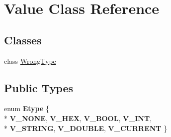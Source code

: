 \hypertarget{classValue}{\section{Value Class Reference}
\label{classValue}
}
\subsection*{Classes}
\begin{DoxyCompactItemize}
\item 
class \hyperlink{classValue_1_1WrongType}{Wrong\-Type}
\end{DoxyCompactItemize}
\subsection*{Public Types}
\begin{DoxyCompactItemize}
\item 
enum {\bfseries Etype} \{ \\*
{\bfseries V\-\_\-\-N\-O\-N\-E}, 
{\bfseries V\-\_\-\-H\-E\-X}, 
{\bfseries V\-\_\-\-B\-O\-O\-L}, 
{\bfseries V\-\_\-\-I\-N\-T}, 
\\*
{\bfseries V\-\_\-\-S\-T\-R\-I\-N\-G}, 
{\bfseries V\-\_\-\-D\-O\-U\-B\-L\-E}, 
{\bfseries V\-\_\-\-C\-U\-R\-R\-E\-N\-T}
 \}
\end{DoxyCompactItemize}
